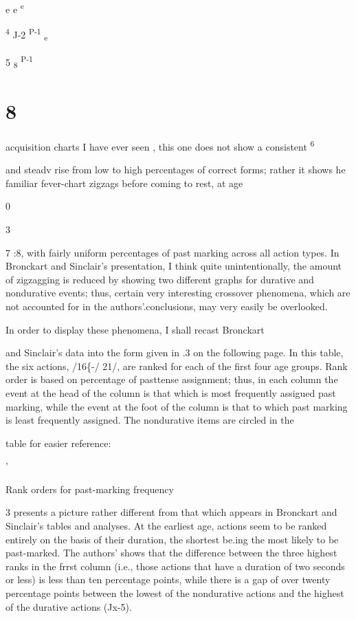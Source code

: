 e e \textsuperscript{e}

\textsuperscript{4 }J-2 \textsuperscript{P-1 }\textsubscript{e} 

5 \textsubscript{8 }\textsuperscript{P-1} 

\chapter{8}

acquisition charts I have ever seen , this one does not show a consistent\textsuperscript{ 6}

and steadv rise from low to high percentages of correct forms; rather it shows he familiar fever-chart zigzags before coming to rest, at age

0

\begin{table}
\caption{3}
\label{tab:3}
\end{table}

7 :8, with fairly uniform percentages of past marking across all action types. In Bronckart and Sinclair's presentation, I think quite unin\-tentionally, the amount of zigzagging is reduced by showing two different graphs for durative and nondurative events; thus, certain very interesting crossover phenomena, which are not accounted for in the authors'.conclusions, may very easily be overlooked.

In order to display these phenomena, I shall recast Bronckart

and Sinclair's data into the form given in .3 on the following page. In this table, the six actions, /16\{-/ 21/, are ranked for each of the first four age groups. Rank order is based on percentage of past\-tense assignment; thus, in each column the event at the head of the column is that which is most frequently assigued past marking, while the event at the foot of the column is that to which past marking is least frequently assigned. The nondurative items are circled in the

table for easier reference:

'

Rank orders for past-marking frequency

\begin{table}
\caption{3 presents a picture rather different from that which appears in Bronckart and Sinclair's tables and analyses. At the earliest age, actions seem to be ranked entirely on the basis of their duration, the shortest be.ing the most likely to be past-marked. The authors'  shows that the difference between the three highest ranks in the frrst column (i.e., those actions that have a duration of two seconds or less) is less than ten percentage points, while there is a gap of over twenty percentage points between the lowest of the nondurative actions and the highest of the durative actions (Jx-5).}
\label{tab:3}
\end{table}

